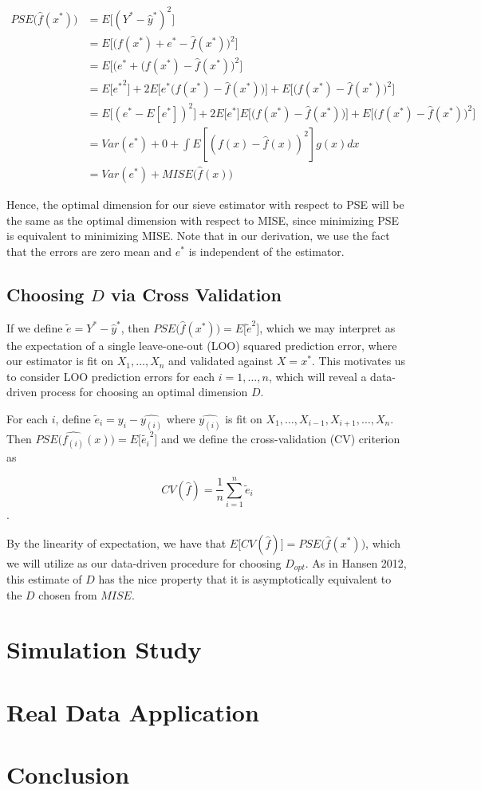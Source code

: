 \documentclass[12pt]{article}  %
\begin{document}
\begin{align*}
PSE\Big(\hat{f}(x^*)\Big) &= E\Big[(Y^* - \hat{y}^*)^2\Big] \\
&= E\Big[\Big(f(x^*) + e^* - \hat{f}(x^*)\Big)^2\Big] \\
&= E\Big[\Big(e^* + (f(x^*) - \hat{f}(x^*)\Big)^2\Big] \\
&= E\big[{e^*}^2\big] + 2E\Big[e^*\Big(f(x^*) - \hat{f}(x^*)\Big)\Big] + E\Big[\Big(f(x^*) - \hat{f}(x^*)\Big)^2\Big] \\
&= E\Big[{(e^* - E[e^*])}^2\Big] + 2E\big[e^*\big]E\Big[\Big(f(x^*) - \hat{f}(x^*)\Big)\Big] + E\Big[\Big(f(x^*) - \hat{f}(x^*)\Big)^2\Big] \\
&= Var(e^*) + 0 + \int E[(f(x) - \hat{f}(x))^2]g(x)dx \\
& = Var(e^*) + MISE\Big(\hat{f}(x)\Big)
\end{align*}

Hence, the optimal dimension for our sieve estimator with respect to PSE will be the same as the optimal dimension with respect to MISE, since minimizing PSE is equivalent to minimizing MISE. Note that in our derivation, we use the fact that the errors are zero mean and $e^*$ is independent of the estimator. 

\subsection{Choosing $D$ via Cross Validation}

If we define $\tilde{e} = Y^* - \hat{y}^*$, then $PSE\Big(\hat{f}(x^*)\Big) = E\big[\tilde{e}^2\big]$, which we may interpret as the expectation of a single leave-one-out (LOO) squared prediction error, where our estimator is fit on $X_1, \ldots, X_n$ and validated against $X = x^*$. This motivates us to consider LOO prediction errors for each $i = 1, \ldots, n$, which will reveal a data-driven process for choosing an optimal dimension $D$.

For each $i$, define $\tilde{e}_i = y_i - \hat{y_{(i)}}$ where $\hat{y_{(i)}}$ is fit on $X_1, \ldots, X_{i-1}, X_{i+1}, \ldots, X_n$. Then $PSE\Big(\hat{f_{(i)}}(x)\Big) = E\big[\tilde{e_i}^2\big]$ and we define the cross-validation (CV) criterion as

$$CV(\hat{f}) = \frac{1}{n}\sum_{i=1}^n \tilde{e}_i$$.

By the linearity of expectation, we have that $E\Big[CV(\hat{f})\Big] = PSE\Big(\hat{f}(x^*)\Big)$, which we will utilize as our data-driven procedure for choosing $D_{opt}$. As in Hansen 2012, this estimate of $D$ has the nice property that it is asymptotically equivalent to the $D$ chosen from $MISE$.
\section{Simulation Study}


\section{Real Data Application}


\section{Conclusion}
\end{document}
